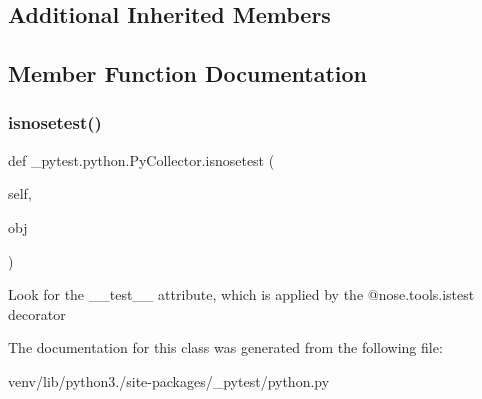 \subsection*{Additional Inherited Members}


\subsection{Member Function Documentation}
\mbox{\label{class__pytest_1_1python_1_1_py_collector_ab2fa5c912b2fcf458c154d9af939096b}} 
\subsubsection{\texorpdfstring{isnosetest()}{isnosetest()}}
{\footnotesize\ttfamily def \+\_\+pytest.\+python.\+Py\+Collector.\+isnosetest (\begin{DoxyParamCaption}\item[{}]{self,  }\item[{}]{obj }\end{DoxyParamCaption})}

\begin{DoxyVerb}Look for the __test__ attribute, which is applied by the
@nose.tools.istest decorator
\end{DoxyVerb}
 

The documentation for this class was generated from the following file\+:\begin{DoxyCompactItemize}
\item 
venv/lib/python3./site-\/packages/\+\_\+pytest/python.\+py\end{DoxyCompactItemize}
